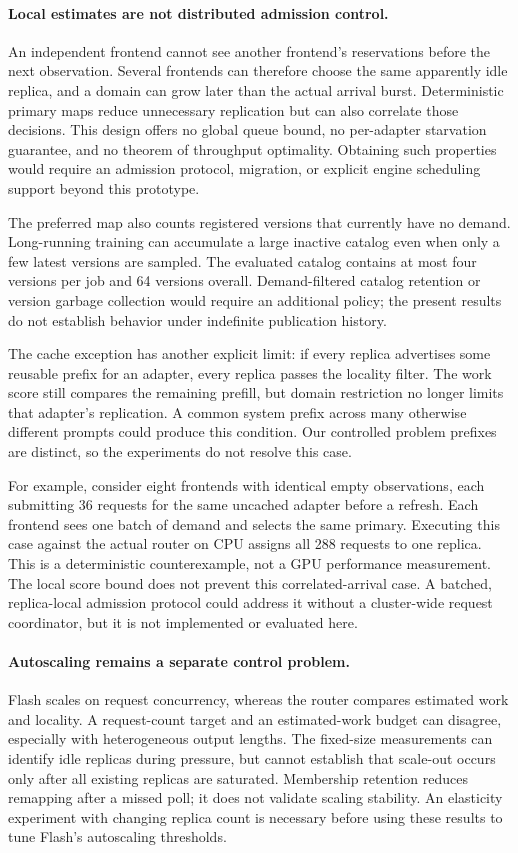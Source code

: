 \paragraph{Local estimates are not distributed admission control.}
An independent frontend cannot see another frontend's reservations before the
next observation. Several frontends can therefore choose the same apparently
idle replica, and a domain can grow later than the actual arrival burst.
Deterministic primary maps reduce unnecessary replication but can also correlate
those decisions. This design offers no global queue bound, no per-adapter
starvation guarantee, and no theorem of throughput optimality. Obtaining such
properties would require an admission protocol, migration, or explicit engine
scheduling support beyond this prototype.

The preferred map also counts registered versions that currently have no demand.
Long-running training can accumulate a large inactive catalog even when only a
few latest versions are sampled. The evaluated catalog contains at most four
versions per job and 64 versions overall. Demand-filtered catalog retention or
version garbage collection would require an additional policy; the present
results do not establish behavior under indefinite publication history.

The cache exception has another explicit limit: if every replica advertises
some reusable prefix for an adapter, every replica passes the locality filter.
The work score still compares the remaining prefill, but domain restriction no
longer limits that adapter's replication. A common system prefix across many
otherwise different prompts could produce this condition. Our controlled
problem prefixes are distinct, so the experiments do not resolve this case.

For example, consider eight frontends with identical empty observations, each
submitting 36 requests for the same uncached adapter before a refresh. Each
frontend sees one batch of demand and selects the same primary. Executing this
case against the actual router on CPU assigns all 288 requests to one replica.
This is a deterministic counterexample, not a GPU performance measurement. The
local score bound does not prevent this correlated-arrival case. A batched,
replica-local admission protocol could address it without a cluster-wide request
coordinator, but it is not implemented or evaluated here.

\paragraph{Autoscaling remains a separate control problem.}
Flash scales on request concurrency, whereas the router compares estimated work
and locality. A request-count target and an estimated-work budget can disagree,
especially with heterogeneous output lengths. The fixed-size measurements can
identify idle replicas during pressure, but cannot establish that scale-out
occurs only after all existing replicas are saturated. Membership retention
reduces remapping after a missed poll; it does not validate scaling stability.
An elasticity experiment with changing replica count is necessary before using
these results to tune Flash's autoscaling thresholds.

